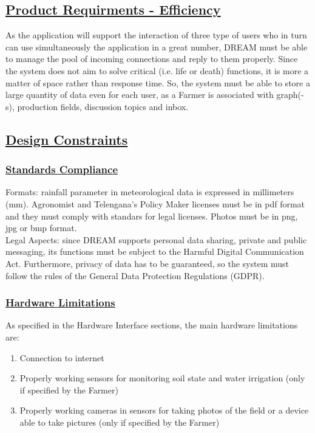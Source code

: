 	\subsection[Product Requirments Efficiency]{\hyperlink{toc}{Product Requirments - Efficiency}}
	As the application will support the interaction of three type of users who in turn can use simultaneously the application in a great number, DREAM must be able to manage the pool of incoming connections and reply to them properly. Since the system does not aim to solve critical (i.e. life or death) functions, it is more a matter of space rather than response  time. So, the system must be able to store a large quantity of data even for each user, as a Farmer is associated with graph(-s), production fields, discussion topics and inbox.
	
	
	\subsection[Design Constraints]{\hyperlink{toc}{Design Constraints}}
		\subsubsection[Standards Compliance]{\hyperlink{toc}{Standards Compliance}}
			\label{sec:standardCompliance}
			Formats: rainfall parameter in meteorological data is expressed in millimeters (mm).
			Agronomist and Telengana's Policy Maker licenses must be in pdf format and they must comply with standars for legal licenses. 
			Photos must be in png, jpg or bmp format. \\
			
			Legal Aspects: since DREAM supports personal data sharing, private and public messaging, its functions must be subject to the Harmful Digital Communication Act. Furthermore, privacy of data has to be guaranteed, so the system must follow the rules of the General Data Protection Regulations (GDPR).
		\subsubsection[Hardware Limitations]{\hyperlink{toc}{Hardware Limitations}}
			As specified in the Hardware Interface sections, the main hardware limitations are:
			
			\begin{enumerate}
				\item Connection to internet
				\item Properly working sensors for monitoring soil state and water irrigation (only if specified by the Farmer)
				\item Properly working cameras in sensors for taking photos of the field or a device able to take pictures (only if specified by the Farmer)
			\end{enumerate}
		
